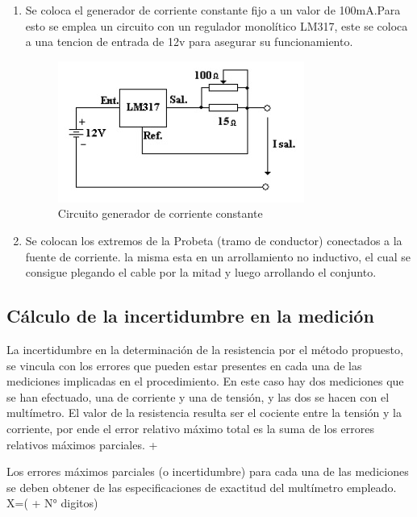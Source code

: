 \documentclass[12pt, letterpaper]{article}
\begin{document}
\begin{enumerate}
	\item Se coloca el generador de corriente constante fijo a un valor de 100mA.Para esto se emplea un circuito con un regulador monolítico
	LM317, este se coloca a una tencion de entrada de 12v para asegurar su funcionamiento.
	
	\begin{figure}[h]
		\centering
		\includegraphics{Imagenes/circuito_lm317.jpg}
		\caption{Circuito generador de corriente constante}
	\end{figure}

	\item Se colocan los extremos de la Probeta (tramo de conductor) conectados a la fuente de corriente. la misma esta en un 
	arrollamiento no inductivo, el cual se consigue plegando el cable por la mitad y luego arrollando el conjunto.

\end{enumerate}

\subsection{Cálculo de la incertidumbre en la medición}

La incertidumbre en la determinación de la resistencia por el método propuesto, se vincula con los 
errores que pueden estar presentes en cada una de las mediciones implicadas en el procedimiento. En 
este caso hay dos mediciones que se han efectuado, una de corriente y una de tensión, y las dos se 
hacen con el multímetro. El valor de la resistencia resulta ser el cociente entre la tensión y la 
corriente, por ende el error relativo máximo total es la suma de los errores relativos máximos parciales.
\newline
{}+

\newline
Los errores máximos parciales (o incertidumbre) para cada una de las mediciones se deben 
obtener de las especificaciones de exactitud del multímetro empleado. 
\newline
\Delta X=(  + N° digitos)\\
\end{document}
